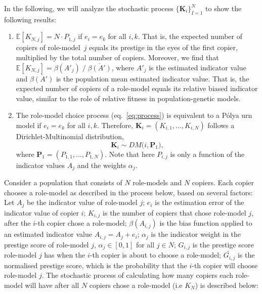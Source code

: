 \documentclass[11pt]{article}
\let\vec\mathbf
\begin{document}
In the following, we will analyze the stochastic process $\{\vec{K}_{i}\}_{I=1}^N$ to show the following results:
\begin{enumerate}
\item $\mathbb{E}[K_{N,j}] = N \cdot P_{1,j}$ if $e_i=e_k$ for all $i,k$. That is, the expected number of copiers of role-model~$j$ equals its prestige in the eyes of the first copier, multiplied by the total number of copiers. Moreover, we find that $\mathbb{E}[K_{N,j}] = \beta(A'_j) \; / \; \overline{ \beta(A') }$, where $A'_j$ is the estimated indicator value and $\overline{ \beta(A') }$ is the population mean estimated indicator value. That is, the expected number of copiers of a role-model equals its relative biased indicator value, similar to the role of relative fitness in population-genetic models.
\item The role-model choice process (eq.~\ref{eq:process}) is equivalent to a P\'{o}lya urn model if $e_i=e_k$ for all $i,k$. Therefore, $\vec{K}_i = (K_{i,1}, \ldots, K_{i,N})$ follows a Dirichlet-Multinomial distribution,
\begin{equation}
\vec{K}_i \sim \mathit{DM}\big(i, \vec{P}_1\big), %
\end{equation}
where $\vec{P}_1 = (P_{1,1}, \ldots, P_{1,N})$.
Note that here $P_{i,j}$ is only a function of the indicator values $A_j$ and the weights $\alpha_j$.
\end{enumerate}


\pagebreak

Consider a population that consists of $N$ role-models and $N$ copiers.
Each copier chooses a role-model as described in the process below, based on several factors:
Let $A_j$ be the indicator value of role-model $j$; $e_i$ is the estimation error of the indicator value of copier $i$;
$K_{i,j}$ is the number of copiers that chose role-model $j$, after the $i$-th copier chose a role-model;
$\beta(A_{i,j})$ is the bias function applied to an estimated indicator value $A_{i,j} = A_j + e_i$;
$\alpha_j$ is the indicator weight in the prestige score of role-model $j$, $\alpha_j \in [0,1]$ for all $j \in N$;
$G_{i,j}$ is the prestige score role-model $j$ has when the $i$-th copier is about to choose a role-model;
$\widetilde{G_{i,j}}$ is the normalised prestige score, which is the probability that the $i$-th copier will choose role-model $j$.
The stochastic process of calculating how many copiers each role-model will have after all $N$ copiers chose a role-model (i.e $K_N$) is described below:
\end{document}
